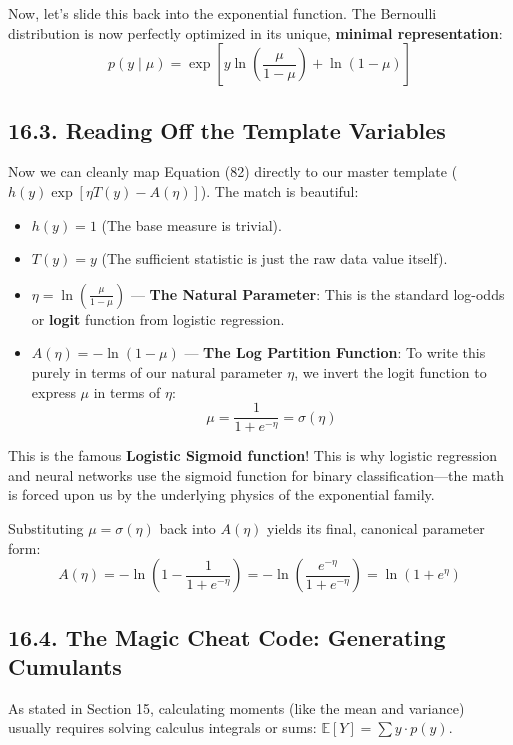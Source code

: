 \documentclass{article}
\begin{document}
Now, let's slide this back into the exponential function. The Bernoulli distribution is now perfectly optimized in its unique, \textbf{minimal representation}:
\begin{equation}
p(y \mid \mu) = \exp\left[ y \ln\left( \frac{\mu}{1 - \mu} \right) + \ln(1 - \mu) \right] \tag{82}
\end{equation}

\subsection*{16.3. Reading Off the Template Variables}
Now we can cleanly map Equation (82) directly to our master template ($h(y) \exp[\eta T(y) - A(\eta)]$). The match is beautiful:
\begin{itemize}
    \item $h(y) = 1$ (The base measure is trivial).
    \item $T(y) = y$ (The sufficient statistic is just the raw data value itself).
    \item $\eta = \ln\left( \frac{\mu}{1 - \mu} \right)$ --- \textbf{The Natural Parameter}: This is the standard log-odds or \textbf{logit} function from logistic regression.
    \item $A(\eta) = -\ln(1 - \mu)$ --- \textbf{The Log Partition Function}: To write this purely in terms of our natural parameter $\eta$, we invert the logit function to express $\mu$ in terms of $\eta$:
    \begin{equation}
    \mu = \frac{1}{1 + e^{-\eta}} = \sigma(\eta) \tag{83}
    \end{equation}
\end{itemize}
This is the famous \textbf{Logistic Sigmoid function}! This is why logistic regression and neural networks use the sigmoid function for binary classification—the math is forced upon us by the underlying physics of the exponential family.

Substituting $\mu = \sigma(\eta)$ back into $A(\eta)$ yields its final, canonical parameter form:
\begin{equation}
A(\eta) = -\ln\left(1 - \frac{1}{1 + e^{-\eta}}\right) = -\ln\left(\frac{e^{-\eta}}{1 + e^{-\eta}}\right) = \ln(1 + e^{\eta}) \tag{84}
\end{equation}

\subsection*{16.4. The Magic Cheat Code: Generating Cumulants}
As stated in Section 15, calculating moments (like the mean and variance) usually requires solving calculus integrals or sums: $\mathbb{E}[Y] = \sum y \cdot p(y)$. 
\end{document}
